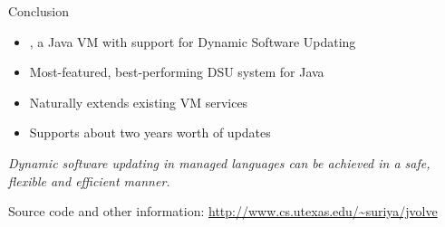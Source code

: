 


\begin{frame}{Conclusion}%
\begin{itemize}
\item \DSU{}, a Java VM with support for Dynamic Software Updating
\item Most-featured, best-performing DSU system for Java
\item Naturally extends existing VM services
\item Supports about two years worth of updates
\end{itemize}
\begin{block}{}
\emph{Dynamic software updating in managed languages can be achieved in a
safe, flexible and efficient manner.}
\end{block}
\begin{center}
Source code and other information:
\url{http://www.cs.utexas.edu/~suriya/jvolve}
\end{center}
\end{frame}
